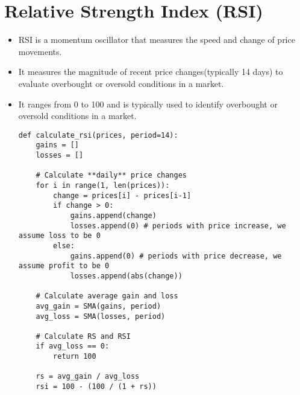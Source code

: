 \documentclass{article}
\begin{document}
\section*{Relative Strength Index (RSI)}
\begin{itemize}
    \item RSI is a momentum oscillator that measures the speed and change of price movements.
    \item It measures the magnitude of recent price changes(typically 14 days) to evaluate overbought or oversold conditions in a market.
    \item It ranges from 0 to 100 and is typically used to identify overbought or oversold conditions in a market.
    \begin{lstlisting}
def calculate_rsi(prices, period=14):
    gains = []
    losses = []
    
    # Calculate **daily** price changes
    for i in range(1, len(prices)):
        change = prices[i] - prices[i-1]
        if change > 0:
            gains.append(change)
            losses.append(0) # periods with price increase, we assume loss to be 0
        else:
            gains.append(0) # periods with price decrease, we assume profit to be 0
            losses.append(abs(change))
    
    # Calculate average gain and loss
    avg_gain = SMA(gains, period)
    avg_loss = SMA(losses, period)
    
    # Calculate RS and RSI
    if avg_loss == 0:
        return 100
    
    rs = avg_gain / avg_loss
    rsi = 100 - (100 / (1 + rs))
    

\end{lstlisting}
\end{itemize}
\end{document}
